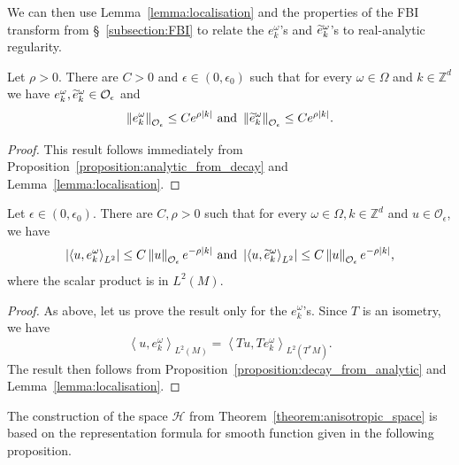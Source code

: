 \documentclass[AHL,Unicode,longabstracts,published]{cedram}
\newcommand{\n}[1]{\left\|#1\right\|}
\newcommand{\va}[1]{\left|#1\right|}
\newcommand{\clO}{\mathcal{O}}
\newcommand{\clH}{\mathcal{H}}
\newcommand{\bbZ}{\mathbb{Z}}
\let\oldtilde\tilde
\renewcommand*{\tilde}[1]{\mathchoice{\widetilde{#1}}{\widetilde{#1}}{\oldtilde{#1}}{\oldtilde{#1}}}
\newcommand{\clO}{\mathcal{O}}
\begin{document}
We can then use Lemma~\ref{lemma:localisation} and the properties of the FBI transform from \S~\ref{subsection:FBI} to relate the $e_k^\omega$'s and $\tilde{e}_k^\omega$'s to real-analytic regularity.

\begin{lemm}\label{lemma:ekomega_analytic}
Let $\rho > 0$. There are $C > 0$ and $\epsilon \in (0,\epsilon_0)$ such that for every $\omega \in \Omega$ and $k \in \bbZ^d$ we have $e_k^\omega, \tilde{e}_k^\omega \in \clO_\epsilon$ and
\begin{equation*}
\n{e_k^\omega}_{\clO_\epsilon} \leq C e^{\rho \va{k}} \text{ and } \n{\tilde{e}_k^\omega}_{\clO_\epsilon} \leq C e^{\rho \va{k}}.
\end{equation*}
\end{lemm}

\begin{proof}
This result follows immediately from Proposition~\ref{proposition:analytic_from_decay} and Lemma~\ref{lemma:localisation}.
\end{proof}

\begin{lemm}\label{lemma:dual_ekomega}
Let $\epsilon \in(0,\epsilon_0)$. There are $C,\rho > 0$ such that for every $\omega \in \Omega, k \in \bbZ^d$ and $u \in \clO_\epsilon$, we have
\begin{equation*}
\va{\left\langle u, e_k^\omega\right\rangle_{L^2}} \leq C \n{u}_{\clO_\epsilon}e^{- \rho \va{k}} \text{ and } \va{\left\langle u, \tilde{e}_k^\omega\right\rangle_{L^2}} \leq C \n{u}_{\clO_\epsilon} e^{- \rho \va{k}},
\end{equation*}
where the scalar product is in $L^2(M)$.
\end{lemm}

\begin{proof}
As above, let us prove the result only for the $e_k^\omega$'s. Since $T$ is an isometry, we have
\begin{equation}\label{eq:ex_isometry}
\left\langle u, e_k^\omega \right\rangle_{L^2(M)} = \left\langle T u, T e_k^\omega \right\rangle_{L^2(T^* M)}.
\end{equation}
The result then follows from Proposition~\ref{proposition:decay_from_analytic} and Lemma~\ref{lemma:localisation}.
\end{proof}

The construction of the space $\clH$ from Theorem~\ref{theorem:anisotropic_space} is based on the representation formula for smooth function given in the following proposition.
\end{document}
